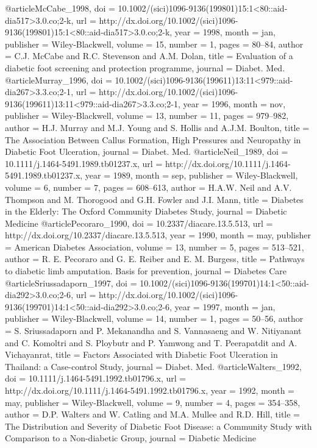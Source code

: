 @article{McCabe_1998,
	doi = {10.1002/(sici)1096-9136(199801)15:1<80::aid-dia517>3.0.co;2-k},
	url = {http://dx.doi.org/10.1002/(sici)1096-9136(199801)15:1<80::aid-dia517>3.0.co;2-k},
	year = 1998,
	month = {jan},
	publisher = {Wiley-Blackwell},
	volume = {15},
	number = {1},
	pages = {80--84},
	author = {C.J. McCabe and R.C. Stevenson and A.M. Dolan},
	title = {Evaluation of a diabetic foot screening and protection programme},
	journal = {Diabet. Med.}
}
@article{Murray_1996,
	doi = {10.1002/(sici)1096-9136(199611)13:11<979::aid-dia267>3.3.co;2-1},
	url = {http://dx.doi.org/10.1002/(sici)1096-9136(199611)13:11<979::aid-dia267>3.3.co;2-1},
	year = 1996,
	month = {nov},
	publisher = {Wiley-Blackwell},
	volume = {13},
	number = {11},
	pages = {979--982},
	author = {H.J. Murray and M.J. Young and S. Hollis and A.J.M. Boulton},
	title = {The Association Between Callus Formation, High Pressures and Neuropathy in Diabetic Foot Ulceration},
	journal = {Diabet. Med.}
}
@article{Neil_1989,
	doi = {10.1111/j.1464-5491.1989.tb01237.x},
	url = {http://dx.doi.org/10.1111/j.1464-5491.1989.tb01237.x},
	year = 1989,
	month = {sep},
	publisher = {Wiley-Blackwell},
	volume = {6},
	number = {7},
	pages = {608--613},
	author = {H.A.W. Neil and A.V. Thompson and M. Thorogood and G.H. Fowler and J.I. Mann},
	title = {Diabetes in the Elderly: The Oxford Community Diabetes Study},
	journal = {Diabetic Medicine}
}
@article{Pecoraro_1990,
	doi = {10.2337/diacare.13.5.513},
	url = {http://dx.doi.org/10.2337/diacare.13.5.513},
	year = 1990,
	month = {may},
	publisher = {American Diabetes Association},
	volume = {13},
	number = {5},
	pages = {513--521},
	author = {R. E. Pecoraro and G. E. Reiber and E. M. Burgess},
	title = {Pathways to diabetic limb amputation. Basis for prevention},
	journal = {Diabetes Care}
}
@article{Sriussadaporn_1997,
	doi = {10.1002/(sici)1096-9136(199701)14:1<50::aid-dia292>3.0.co;2-6},
	url = {http://dx.doi.org/10.1002/(sici)1096-9136(199701)14:1<50::aid-dia292>3.0.co;2-6},
	year = 1997,
	month = {jan},
	publisher = {Wiley-Blackwell},
	volume = {14},
	number = {1},
	pages = {50--56},
	author = {S. Sriussadaporn and P. Mekanandha and S. Vannasaeng and W. Nitiyanant and C. Komoltri and S. Ploybutr and P. Yamwong and T. Peerapatdit and A. Vichayanrat},
	title = {Factors Associated with Diabetic Foot Ulceration in Thailand: a Case-control Study},
	journal = {Diabet. Med.}
}
@article{Walters_1992,
	doi = {10.1111/j.1464-5491.1992.tb01796.x},
	url = {http://dx.doi.org/10.1111/j.1464-5491.1992.tb01796.x},
	year = 1992,
	month = {may},
	publisher = {Wiley-Blackwell},
	volume = {9},
	number = {4},
	pages = {354--358},
	author = {D.P. Walters and W. Catling and M.A. Mullee and R.D. Hill},
	title = {The Distribution and Severity of Diabetic Foot Disease: a Community Study with Comparison to a Non-diabetic Group},
	journal = {Diabetic Medicine}
}
